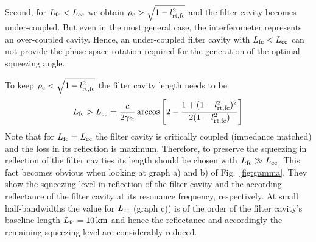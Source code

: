 Second, for $L_{\rm fc} < L_{\rm cc}$ we obtain $\rho_{\rm
c}>\sqrt{1-l_{\rm rt,fc}^2}$ and the filter cavity becomes
under-coupled. But even in the most general case, the
interferometer represents an over-coupled cavity. Hence, an
under-coupled filter cavity with $L_{\rm fc} < L_{\rm cc}$ can not
provide the phase-space rotation required for the generation of
the optimal squeezing angle.

To keep  $\rho_{\rm c}<\sqrt{1-l_{\rm rt,fc}^2}$ the filter cavity length needs to be
\begin{equation}
L_{\rm fc} > L_{\rm cc} =
\frac{c}{2\gamma_{\rm{fc}}}\arccos\left[2-\frac{1+(1-l_{\rm
rt,fc}^2)^2}{2(1-l_{\rm rt,fc}^2)}\right]\label{eq:lcc}
\end{equation}
Note that for $L_{\rm fc}=L_{\rm cc}$ the filter cavity is
critically coupled (impedance matched) and the loss in its
reflection is maximum. Therefore, to preserve the squeezing in
reflection of the filter cavities its length should be chosen with
$L_{\rm fc} \gg L_{\rm cc}$. This fact becomes obvious when
looking at graph a) and b) of Fig.~\ref{fig:gamma}. They show the
squeezing level in reflection of the filter cavity and the according reflectance of the filter cavity at its resonance frequency, respectively. At small half-bandwidths the
value for $L_{\rm cc}$ (graph c)) is of the order of the filter
cavity's baseline length $L_{\rm fc}=10\,{\rm km}$ and hence the reflectance
and accordingly the remaining squeezing level are considerably
reduced.

